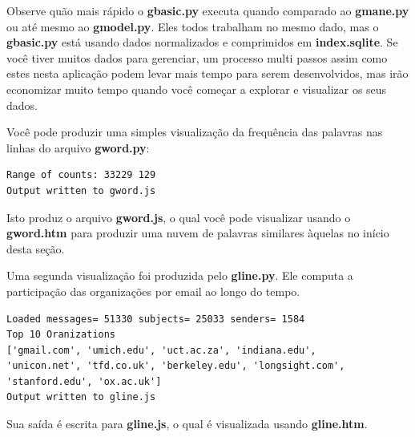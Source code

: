 Observe quão mais rápido o {\bf gbasic.py} executa quando comparado ao {\bf gmane.py}
ou até mesmo ao {\bf gmodel.py}. Eles todos trabalham no mesmo dado, mas o {\bf gbasic.py}
está usando dados normalizados e comprimidos em {\bf index.sqlite}. Se você tiver
muitos dados para gerenciar, um processo multi passos assim como estes nesta aplicação
podem levar mais tempo para serem desenvolvidos, mas irão economizar muito tempo
quando você começar a explorar e visualizar os seus dados.

Você pode produzir uma simples visualização da frequência das palavras nas
linhas do arquivo {\bf gword.py}: 

\beforeverb
\begin{verbatim}
Range of counts: 33229 129
Output written to gword.js
\end{verbatim}
\afterverb
%

Isto produz o arquivo {\bf gword.js}, o qual você pode visualizar usando
o {\bf gword.htm} para produzir uma nuvem de palavras similares àquelas
no início desta seção.

Uma segunda visualização foi produzida pelo {\bf gline.py}. Ele computa a 
participação das organizações por email ao longo do tempo. 

\beforeverb
\begin{verbatim}
Loaded messages= 51330 subjects= 25033 senders= 1584
Top 10 Oranizations
['gmail.com', 'umich.edu', 'uct.ac.za', 'indiana.edu', 
'unicon.net', 'tfd.co.uk', 'berkeley.edu', 'longsight.com', 
'stanford.edu', 'ox.ac.uk']
Output written to gline.js
\end{verbatim}
\afterverb
%

Sua saída é escrita para {\bf gline.js}, o qual é visualizada usando {\bf gline.htm}.

